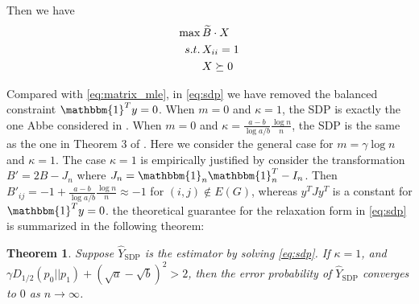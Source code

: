 \documentclass[conference]{IEEEtran}
\newtheorem{theorem}{Theorem}
\DeclareMathOperator{\SDP}{SDP}
\begin{document}
Then we have
\begin{align}
\max\, & \widetilde{B} \cdot X \notag \\
s.t.\,& X_{ii}=1 \notag \\
& X \succeq 0 \label{eq:sdp}
\end{align}

Compared with \eqref{eq:matrix_mle}, in \eqref{eq:sdp} we have removed
the balanced constraint $\mathbbm{1}^T y = 0$. When $m=0$ and $\kappa=1$,
the SDP is exactly the one Abbe considered in \cite{abbe2015exact}.
When $m=0$ and $\kappa=\frac{a-b}{\log a/b}\frac{\log n}{n}$, the SDP is
the same as the one in Theorem 3 of \cite{Hajek16}. Here we consider the
general case for $m=\gamma \log n$ and $\kappa = 1$. The case $\kappa=1$
is empirically justified by consider the transformation $B'=2B-J_n$ where
$J_n=\mathbbm{1}_n \mathbbm{1}_n^T- I_n$. Then $B'_{ij} = -1 +\frac{a-b}{\log a/b}\frac{\log n}{n} \approx -1$
for $(i,j)\not\in E(G)$, whereas $y^T J y^T$ is a constant for $\mathbbm{1}^T y = 0$.
the theoretical guarantee for the relaxation form in \eqref{eq:sdp} is summarized
in the following theorem:
\begin{theorem}\label{thm:sdp}
	Suppose $\hat{Y}_{\SDP}$ is the estimator by solving \eqref{eq:sdp}.
	If $\kappa = 1$,
	and $\gamma D_{1/2}(p_0||p_1) + (\sqrt{a} - \sqrt{b})^2 > 2$,
	then the error probability of $\hat{Y}_{\SDP}$ converges to $0$ as $n\to \infty$.
\end{theorem}
\end{document}

